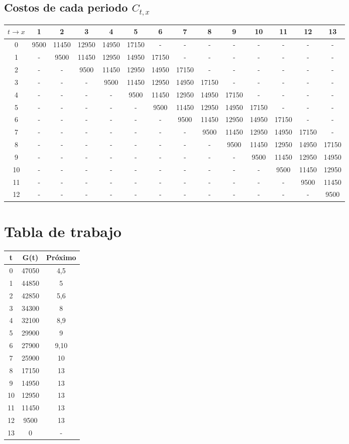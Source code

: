 \documentclass[12pt]{article}
\begin{document}
\newpage
\begin{landscape}
\subsection*{Costos de cada periodo $C_{t,x}$}
\begin{longtable}{|c|c|c|c|c|c|c|c|c|c|c|c|c|c|}
\hline
$t \to x$  & 1 & 2 & 3 & 4 & 5 & 6 & 7 & 8 & 9 & 10 & 11 & 12 & 13 \\\hline\hline
0 & 9500 & 11450 & 12950 & 14950 & 17150 & - & - & - & - & - & - & - & - \\\hline
1 & - & 9500 & 11450 & 12950 & 14950 & 17150 & - & - & - & - & - & - & - \\\hline
2 & - & - & 9500 & 11450 & 12950 & 14950 & 17150 & - & - & - & - & - & - \\\hline
3 & - & - & - & 9500 & 11450 & 12950 & 14950 & 17150 & - & - & - & - & - \\\hline
4 & - & - & - & - & 9500 & 11450 & 12950 & 14950 & 17150 & - & - & - & - \\\hline
5 & - & - & - & - & - & 9500 & 11450 & 12950 & 14950 & 17150 & - & - & - \\\hline
6 & - & - & - & - & - & - & 9500 & 11450 & 12950 & 14950 & 17150 & - & - \\\hline
7 & - & - & - & - & - & - & - & 9500 & 11450 & 12950 & 14950 & 17150 & - \\\hline
8 & - & - & - & - & - & - & - & - & 9500 & 11450 & 12950 & 14950 & 17150 \\\hline
9 & - & - & - & - & - & - & - & - & - & 9500 & 11450 & 12950 & 14950 \\\hline
10 & - & - & - & - & - & - & - & - & - & - & 9500 & 11450 & 12950 \\\hline
11 & - & - & - & - & - & - & - & - & - & - & - & 9500 & 11450 \\\hline
12 & - & - & - & - & - & - & - & - & - & - & - & - & 9500 \\\hline
\end{longtable}
\end{landscape}
\section*{Tabla de trabajo}
\begin{tabular}{ccc}\toprule
t & G(t) & Próximo \\\midrule
0 & 47050 & 4,5 \\
1 & 44850 & 5 \\
2 & 42850 & 5,6 \\
3 & 34300 & 8 \\
4 & 32100 & 8,9 \\
5 & 29900 & 9 \\
6 & 27900 & 9,10 \\
7 & 25900 & 10 \\
8 & 17150 & 13 \\
9 & 14950 & 13 \\
10 & 12950 & 13 \\
11 & 11450 & 13 \\
12 & 9500 & 13 \\
13 & 0 & - \\
\bottomrule\end{tabular}
\end{document}
